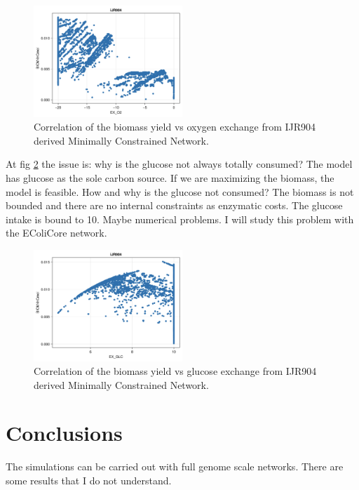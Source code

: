 \documentclass[11pt, letterpaper]{article}
\begin{document}
\begin{figure}[h!]
   \centering
   \includegraphics[width=0.5\textwidth]{images/yield_ex_o2_corr.png}
   \caption{
       Correlation of the biomass yield vs oxygen exchange from IJR904 derived Minimally Constrained Network.
   }
   \label{fig:yield.ex_o2.corr}
\end{figure}




\begin{issue-box}[]
   \label{issue:yield.ex_glc.corr}
   At fig \ref{fig:yield.ex_glc.corr} the issue is: why is the glucose not always totally consumed?
   The model has glucose as the sole carbon source.
   If we are maximizing the biomass, the model is feasible.
   How and why is the glucose not consumed?
   The biomass is not bounded and there are no internal constraints as enzymatic costs.
   The glucose intake is bound to 10.
   Maybe numerical problems.
   I will study this problem with the EColiCore network.
\end{issue-box}


\begin{figure}[h!]
   \centering
   \includegraphics[width=0.5\textwidth]{images/yield_ex_glc_corr.png}
   \caption{
       Correlation of the biomass yield vs glucose exchange from IJR904 derived Minimally Constrained Network.
   }
   \label{fig:yield.ex_glc.corr}
\end{figure}


\section{Conclusions}


The simulations can be carried out with full genome scale networks.
There are some results that I do not understand.






  
\end{document}
